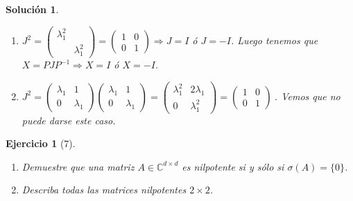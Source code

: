 \documentclass[11pt, a4paper]{article}
\newif\IfInSansMode
\theoremstyle{theorem-style}
\theoremstyle{definition-style}
\newtheorem{ejer}{Ejercicio}[section]
\theoremstyle{remark-style}
\newtheorem*{sol}{Solución}
\theoremstyle{example-style}
\newenvironment{nlist}
{\begin{enumerate}
    \renewcommand\labelenumi{(\emph{\roman{enumi})}}}
{\end{enumerate}}
\begin{document}
\begin{sol}
\begin{nlist}
        \item $J^2 =
            \begin{pmatrix}
                \lambda_1^2 & \\
                            & \lambda_1^2
            \end{pmatrix} =  \begin{pmatrix}
                1 & 0 \\
                0 & 1
            \end{pmatrix} \Rightarrow J = I$ ó $J = -I$. Luego tenemos que $X = PJP^{-1} \Rightarrow X= I$ ó
            $X = -I$.
        \item $J^2 =
            \begin{pmatrix}
                \lambda_1 & 1 \\
                0 & \lambda_1
            \end{pmatrix}
            \begin{pmatrix}
                \lambda_1 & 1 \\
                0 & \lambda_1
            \end{pmatrix} =
            \begin{pmatrix}
                \lambda_1^2 & 2\lambda_1 \\
                0 & \lambda_1^2
            \end{pmatrix} = \begin{pmatrix}
                1 & 0 \\
                0 & 1
            \end{pmatrix} \ $.
            Vemos que no puede darse este caso.
        \end{nlist}
    \end{sol}

    \begin{ejer}[7] \hfill
        \begin{nlist}
        \item Demuestre que una matriz $A \in \mathbb C^{d\times d}$ es nilpotente si
            y sólo si $\sigma(A) = \{0\}$.
        \item Describa todas las matrices nilpotentes $2 \times 2$.
        \end{nlist}
    \end{ejer}
\end{document}
